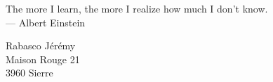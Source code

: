 \cleardoublepage
\thispagestyle{empty}


\vspace*{3cm}

\begin{raggedleft}
    	The more I learn, the more I realize how much I don't know.\\
     --- Albert Einstein\\
\end{raggedleft}

\vspace{4cm}

\begin{center}
    Rabasco J\'er\'emy\\
    Maison Rouge 21\\
    3960 Sierre
\end{center}
